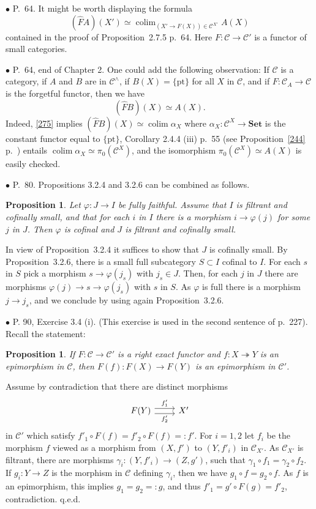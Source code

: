 \documentclass[12pt]{article}
\newtheorem{prop}[thm]{Proposition}
\theoremstyle{remark}%
\newcommand{\bu}{\bullet}
\newcommand{\n}{\noindent}
\newcommand{\C}{\mathcal C}
\newcommand{\Set}{\textbf{Set}}
\newcommand{\epi}{\twoheadrightarrow}
\newcommand{\p}{\varphi}
\newcommand{\be}{\begin{equation}}
\newcommand{\ee}{\end{equation}}
\newcommand{\pr}{Proposition}
\DeclareMathOperator*{\co}{colim}
\begin{document}

\n$\bu$ P.~64. It might be worth displaying the formula 
\be\label{275}
(\widehat FA)(X')\simeq\co_{(X'\to F(X))\in\C^{X'}}A(X)
\ee
contained in the proof of \pr\ 2.7.5 p.~64. Here $F:\C\to\C'$ is a functor of small categories. 


\n$\bu$ P.~64, end of Chapter 2. One could add the following observation: If $\C$ is a category, if $A$ and $B$ are in $\C^\wedge$, if $B(X)=\{\text{pt}\}$ for all $X$ in $\C$, and if $F:\C_A\to\C$ is the forgetful functor, then we have 
\be\label{1725}
(\widehat FB)(X)\simeq A(X).
\ee
Indeed, \eqref{275} implies $(\widehat FB)(X)\simeq\co\alpha_X$ where $\alpha_X:\C^X\to\Set$ is the constant functor equal to $\{\text{pt}\}$, Corollary 2.4.4 (iii) p.~55 (see Proposition~\ref{244} p.~\pageref{244}) entails $\co\alpha_X\simeq\pi_0(\C^X)$, and the isomorphism $\pi_0(\C^X)\simeq A(X)$ is easily checked. 


\n$\bu$ P.~80. \pr s 3.2.4 and 3.2.6 can be combined as follows. 

\begin{prop}\label{comb} 
Let $\p:J\to I$ be fully faithful. Assume that $I$ is filtrant and cofinally small, and that for each $i$ in $I$ there is a morphism $i\to\p(j)$ for some $j$ in $J$. Then $\p$ is cofinal and $J$ is filtrant and cofinally small. 
\end{prop} 

\n{\em Proof.} In view of \pr\ 3.2.4 it suffices to show that $J$ is cofinally small. By \pr\ 3.2.6, there is a small full subcategory $S\subset I$ cofinal to $I$. For each $s$ in $S$ pick a morphism $s\to\p(j_s)$ with $j_s\in J$. Then, for each $j$ in $J$ there are morphisms $\p(j)\to s\to\p(j_s)$ with $s$ in $S$. As $\p$ is full there is a morphism $j\to j_s$, and we conclude by using again \pr\ 3.2.6. 


\n$\bu$ P. 90, Exercise 3.4 (i). (This exercise is used in the second sentence of p.~227). Recall the statement: 
%
\begin{prop}\label{34i}
If $F:\C\to\C'$ is a right exact functor and $f:X\epi Y$ is an epimorphism in $\C$, then $F(f):F(X)\to F(Y)$ is an epimorphism in $\C'$.
\end{prop}
%
\n{\em Proof.} Assume by contradiction that there are distinct morphisms 
$$
\begin{tikzcd}F(Y)\ar[yshift=.7ex]{r}{f'_1}\ar[yshift=-.7ex]{r}[swap]{f'_2}&X'\end{tikzcd}
$$ 
in $\C'$ which satisfy 
$
f'_1\circ F(f)=f'_2\circ F(f)=:f'.
$ 
For $i=1,2$ let $f_i$ be the morphism $f$ viewed as a morphism from $(X,f')$ to $(Y,f'_i)$ in $\C_{X'}$. As $\C_{X'}$ is filtrant, there are morphisms $\gamma_i:(Y,f'_i)\to(Z,g')$, such that $\gamma_1\circ f_1=\gamma_2\circ f_2$. If $g_i:Y\to Z$ is the morphism in $\C$ defining $\gamma_i$, then we have $g_1\circ f=g_2\circ f$. As $f$ is an epimorphism, this implies $g_1=g_2=:g$, and thus $f'_1=g'\circ F(g)=f'_2$, contradiction. q.e.d.
\end{document}
